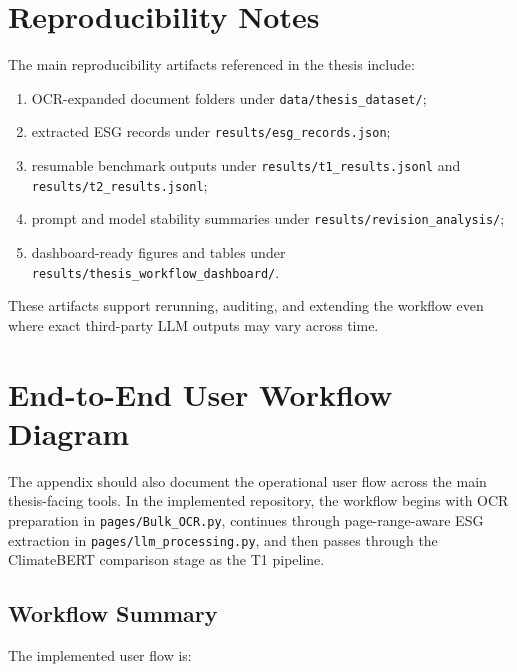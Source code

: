 \section{Reproducibility Notes}\label{reproducibility-notes}

The main reproducibility artifacts referenced in the thesis include:

\begin{enumerate}
\def\labelenumi{\arabic{enumi}.}
\tightlist
\item
  OCR-expanded document folders under \texttt{data/thesis\_dataset/};
\item
  extracted ESG records under \texttt{results/esg\_records.json};
\item
  resumable benchmark outputs under \texttt{results/t1\_results.jsonl} and \texttt{results/t2\_results.jsonl};
\item
  prompt and model stability summaries under \texttt{results/revision\_analysis/};
\item
  dashboard-ready figures and tables under \texttt{results/thesis\_workflow\_dashboard/}.
\end{enumerate}

These artifacts support rerunning, auditing, and extending the workflow even where exact third-party LLM outputs may vary across time.

\section{End-to-End User Workflow Diagram}\label{end-to-end-user-workflow-diagram}

The appendix should also document the operational user flow across the main thesis-facing tools. In the implemented repository, the workflow begins with OCR preparation in \texttt{pages/Bulk\_OCR.py}, continues through page-range-aware ESG extraction in \texttt{pages/llm\_processing.py}, and then passes through the ClimateBERT comparison stage as the T1 pipeline.

\subsection{Workflow Summary}\label{workflow-summary}

The implemented user flow is:

